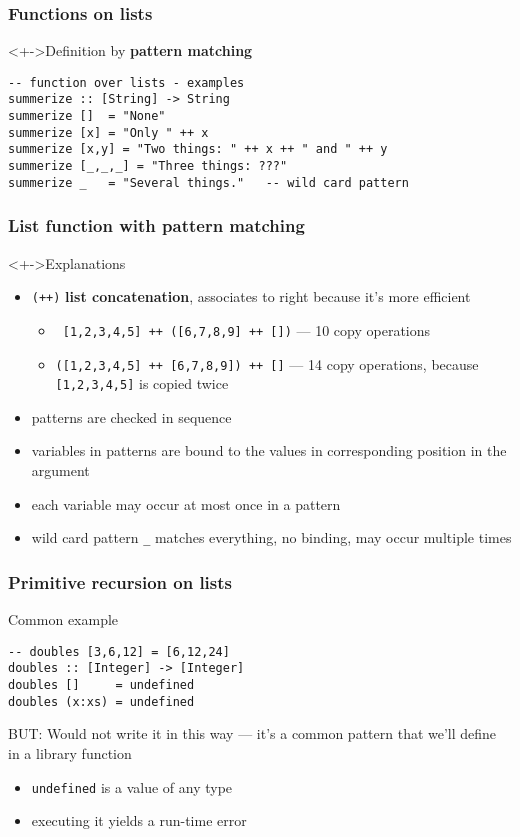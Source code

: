 \documentclass{beamer}
\begin{document}
\begin{frame}[fragile]
  \frametitle{Functions on lists}
  \begin{block}<+->{Definition by \textbf{pattern matching}}
\begin{verbatim}
-- function over lists - examples
summerize :: [String] -> String
summerize []  = "None"
summerize [x] = "Only " ++ x
summerize [x,y] = "Two things: " ++ x ++ " and " ++ y
summerize [_,_,_] = "Three things: ???"
summerize _   = "Several things."   -- wild card pattern
\end{verbatim}
  \end{block}
\end{frame}
\begin{frame}
  \frametitle{List function with pattern matching}
\begin{alertblock}<+->{Explanations}
    \small
    \begin{itemize}
    \item \texttt{(++)} \textbf{list concatenation}, associates to right because it's more efficient
      \begin{itemize}
      \item \texttt{ [1,2,3,4,5] ++ ([6,7,8,9] ++ [])} --- 10 copy
        operations
      \item 
        \texttt{([1,2,3,4,5] ++ [6,7,8,9]) ++ []} --- 14 copy operations,
        because \texttt{[1,2,3,4,5]} is copied twice
      \end{itemize}
    \item  patterns are checked in sequence
    \item  variables in patterns are bound to the values in
      corresponding position in the argument
    \item  each variable may occur at most once in a pattern
    \item  wild card pattern \verb|_| matches everything, no binding, may occur multiple times
    \end{itemize}
  \end{alertblock}
\end{frame}
\begin{frame}[fragile]
  \frametitle{Primitive recursion on lists}
  \begin{block}{Common example}
\begin{verbatim}
-- doubles [3,6,12] = [6,12,24]
doubles :: [Integer] -> [Integer]
doubles []     = undefined
doubles (x:xs) = undefined
\end{verbatim}
    BUT: Would not write it in this way --- it's a common pattern that we'll define in a library function
  \end{block}
  \begin{alertblock}{}
    \begin{itemize}
    \item \texttt{undefined} is a value of any type
    \item executing it yields a run-time error
    \end{itemize}
  \end{alertblock}
\end{frame}
\end{document}
